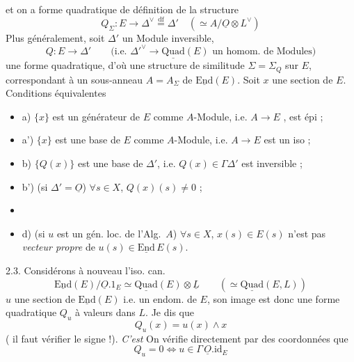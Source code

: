 \documentclass[11pt,a4paper]{article}
\begin{document}
et on a  forme quadratique de définition de la structure  
\[
  Q_\Sigma : E \longrightarrow \Delta^\vee \overset{\mathrm{df}}{=} \Delta' \quad (\simeq A/\underline{O} \otimes L^\vee)
\]
 Plus généralement, soit $\Delta'$ un Module inversible,
\[
  Q : E \longrightarrow \Delta' \qquad \bigl(\text{i.e. } \Delta'^\vee \to \underline{\mathrm{Quad}}(E) \text{ un homom. de Modules}\bigr)
\]
une forme quadratique, d'où une structure de similitude $\Sigma = \Sigma_Q$ sur $E$, correspondant à un sous-anneau $A = A_\Sigma$ de $\underline{\mathrm{End}}(E)$. Soit $x$ une section de $E$. Conditions équivalentes
\begin{itemize}
  \item a) $\{x\}$ est un générateur de $E$ comme $A$-Module, i.e. $A \to E$ , est épi ;
  \item a')  $\{x\}$ est une base de $E$ comme $A$-Module, i.e. $A \to E$ est un iso ;
  \item b) $\{Q(x)\}$ est une base de $\Delta'$, i.e. $Q(x) \in \Gamma \Delta'$ est inversible ;
  \item b') (si $\Delta' = \underline{O}$) $\forall s \in X$, $Q(x)(s) \neq 0$ ;
  \item {} 
  \item d) (si $u$ est un gén. loc. de l'Alg.~$A$) $\forall s \in X$, $x(s) \in E(s)$ n'est pas \emph{vecteur propre} de $u(s) \in \underline{\mathrm{End}}\,E(s)$.
\end{itemize}

2.3. Considérons à nouveau l'iso. can.
\[
  \underline{\mathrm{End}}(E)/\underline{O}.1_E \simeq \underline{\mathrm{Quad}}(E) \otimes \underline{L} \qquad (\simeq \underline{\mathrm{Quad}}(E, L))
\]
 $u$ une section de $\underline{\mathrm{End}}(E)$ i.e. un endom. de $E$,  son image est donc une forme quadratique $Q_u$ à valeurs dans $L$. Je dis que
\[
  \boxed{\,Q_u(x) = u(x) \wedge x\,}
\]
(\struck{\ill{}} il faut vérifier le signe !). \emph{C'est} On vérifie directement par des coordonnées que
\[
  Q_u = 0 \iff u \in \Gamma\, \underline{O}.\mathrm{id}_E
\]
\end{document}
